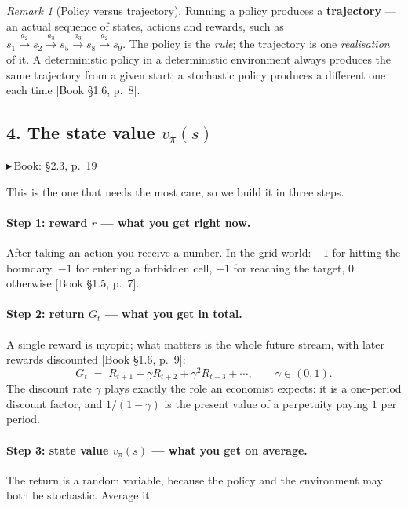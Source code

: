 \documentclass[11pt, letterpaper]{article}
\theoremstyle{runin}
\theoremstyle{runinplain}
\theoremstyle{remark}
\newtheorem*{remark}{Remark}
\newcommand{\bk}[1]{{\color{bookblue}\small$\blacktriangleright$\,\textsf{Book: #1}}}
\newcommand{\bkin}[1]{{\color{bookblue}\small[\textsf{Book #1}]}}
\begin{document}
\begin{remark}[Policy versus trajectory]
Running a policy produces a \textbf{trajectory} --- an actual sequence of states,
actions and rewards, such as
$s_1\xrightarrow{a_2}s_2\xrightarrow{a_3}s_5\xrightarrow{a_3}s_8\xrightarrow{a_2}s_9$.
The policy is the \emph{rule}; the trajectory is one \emph{realisation} of it. A
deterministic policy in a deterministic environment always produces the same
trajectory from a given start; a stochastic policy produces a different one each time
\bkin{\S1.6, p.~8}.
\end{remark}

\subsection*{4. The state value $v_\pi(s)$}

\bk{\S2.3, p.~19}

This is the one that needs the most care, so we build it in three steps.

\paragraph{Step 1: reward $r$ --- what you get right now.} After taking an action you
receive a number. In the grid world: $-1$ for hitting the boundary, $-1$ for entering
a forbidden cell, $+1$ for reaching the target, $0$ otherwise \bkin{\S1.5, p.~7}.

\paragraph{Step 2: return $G_t$ --- what you get in total.} A single reward is
myopic; what matters is the whole future stream, with later rewards discounted
\bkin{\S1.6, p.~9}:
\[
  G_t \;=\; R_{t+1} + \gamma R_{t+2} + \gamma^2 R_{t+3} + \cdots,
  \qquad \gamma\in(0,1).
\]
The discount rate $\gamma$ plays exactly the role an economist expects: it is a
one-period discount factor, and $1/(1-\gamma)$ is the present value of a perpetuity
paying $1$ per period.

\paragraph{Step 3: state value $v_\pi(s)$ --- what you get on average.} The return is
a random variable, because the policy and the environment may both be stochastic.
Average it:
\end{document}
